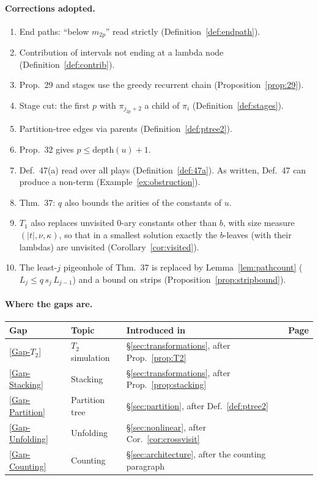 \documentclass[11pt]{article}
\newcommand{\depth}{\mathrm{depth}}
\theoremstyle{plain}
\theoremstyle{definition}
\theoremstyle{remark}
\newcommand{\GapTtwo}{\hyperref[gap:T2]{[Gap-$T_2$]}}
\newcommand{\GapStacking}{\hyperref[gap:stacking]{[Gap-Stacking]}}
\newcommand{\GapPartition}{\hyperref[gap:ptree]{[Gap-Partition]}}
\newcommand{\GapUnfolding}{\hyperref[gap:unfold]{[Gap-Unfolding]}}
\newcommand{\GapCounting}{\hyperref[gap:count]{[Gap-Counting]}}
\begin{document}
\paragraph{Corrections adopted.}
\begin{enumerate}
\item End paths: ``below $m_{2p}$'' read strictly
  (Definition~\ref{def:endpath}).
\item Contribution of intervals not ending at a lambda node
  (Definition~\ref{def:contrib}).
\item Prop.~29 and stages use the greedy recurrent chain
  (Proposition~\ref{prop:29}).
\item Stage cut: the first $p$ with $\pi_{j_{2p}+2}$ a child of $\pi_i$
  (Definition~\ref{def:stages}).
\item Partition-tree edges via parents (Definition~\ref{def:ptree2}).
\item Prop.~32 gives $p\le\depth(u)+1$.
\item Def.~47(a) read over all plays (Definition~\ref{def:47a}).  As
  written, Def.~47 can produce a non-term
  (Example~\ref{ex:obstruction}).
\item Thm.~37: $q$ also bounds the arities of the constants of $u$.
\item $T_1$ also replaces unvisited 0-ary constants other than $b$, with
  size measure $(|t|,\nu,\kappa)$, so that in a smallest solution exactly
  the $b$-leaves (with their lambdas) are unvisited
  (Corollary~\ref{cor:visited}).
\item The least-$j$ pigeonhole of Thm.~37 is replaced by
  Lemma~\ref{lem:pathcount} ($L_j\le q\,s_j\,L_{j-1}$) and a bound on
  strips (Proposition~\ref{prop:stripbound}).
\end{enumerate}

\paragraph{Where the gaps are.}
\begin{center}
\small
\begin{tabular}{llll}
Gap & Topic & Introduced in & Page\\\hline
\GapTtwo & $T_2$ simulation & \S\ref{sec:transformations}, after Prop.~\ref{prop:T2} & \pageref{gap:T2}\\
\GapStacking & Stacking & \S\ref{sec:transformations}, after Prop.~\ref{prop:stacking} & \pageref{gap:stacking}\\
\GapPartition & Partition tree & \S\ref{sec:partition}, after Def.~\ref{def:ptree2} & \pageref{gap:ptree}\\
\GapUnfolding & Unfolding & \S\ref{sec:nonlinear}, after Cor.~\ref{cor:crossvisit} & \pageref{gap:unfold}\\
\GapCounting & Counting & \S\ref{sec:architecture}, after the counting paragraph & \pageref{gap:count}
\end{tabular}
\end{center}
\end{document}
